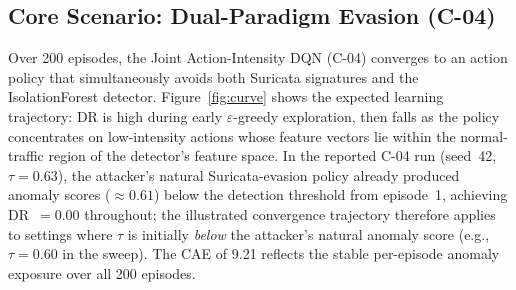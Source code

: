 \documentclass[sigconf]{acmart}
\begin{document}
\subsection{Core Scenario: Dual-Paradigm Evasion (C-04)}
\label{sec:core}

Over 200 episodes, the Joint Action-Intensity DQN (C-04) converges to an
action policy that simultaneously avoids both Suricata signatures and the
IsolationForest detector. Figure~\ref{fig:curve} shows the expected
learning trajectory: DR is high during early $\varepsilon$-greedy
exploration, then falls as the policy concentrates on low-intensity
actions whose feature vectors lie within the normal-traffic region of
the detector's feature space. In the reported C-04 run (seed~42, $\tau=0.63$),
the attacker's natural Suricata-evasion policy already produced anomaly
scores ($\approx\!0.61$) below the detection threshold from episode~1,
achieving DR~$= 0.00$ throughout; the illustrated convergence trajectory
therefore applies to settings where $\tau$ is initially \emph{below} the
attacker's natural anomaly score (e.g., $\tau = 0.60$ in the sweep). The
CAE of 9.21 reflects the stable per-episode anomaly exposure over all
200 episodes.
\end{document}
